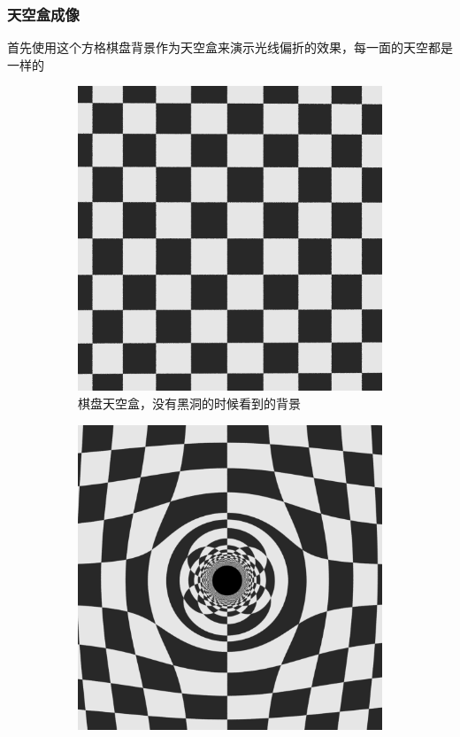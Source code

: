 \subsubsection{天空盒成像}
首先使用这个方格棋盘背景作为天空盒来演示光线偏折的效果，每一面的天空都是一样的
\begin{figure}[H]
    \centering
    \begin{subfigure}{.5\textwidth}
        \centering
        \includegraphics[scale=0.2]{images/chessboard.png}
        \caption{棋盘天空盒，没有黑洞的时候看到的背景}
        \label{fig:chessboard} %
    \end{subfigure}%
    \begin{subfigure}{.5\textwidth}
        \centering
        \includegraphics[scale=0.2]{images/blackhole_chessboard.png}

\end{subfigure}
\end{figure}
